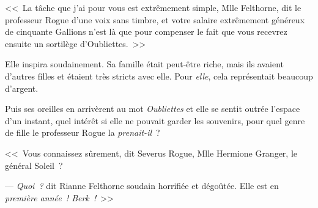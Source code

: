 <<~La tâche que j'ai pour vous est extrêmement simple, Mlle Felthorne, dit le professeur Rogue d'une voix sans timbre, et votre salaire extrêmement généreux de cinquante Gallions n'est là que pour compenser le fait que vous recevrez ensuite un sortilège d'Oubliettes.~>>

Elle inspira soudainement. Sa famille était peut-être riche, mais ils avaient d'autres filles et étaient très stricts avec elle. Pour \emph{elle}, cela représentait beaucoup d'argent.

Puis ses oreilles en arrivèrent au mot \emph{Oubliettes} et elle se sentit outrée l'espace d'un instant, quel intérêt si elle ne pouvait garder les souvenirs, pour quel genre de fille le professeur Rogue la \emph{prenait-il}~?

<<~Vous connaissez sûrement, dit Severus Rogue, Mlle Hermione Granger, le général Soleil~?

--- \emph{Quoi~?} dit Rianne Felthorne soudain horrifiée et dégoûtée. Elle est en \emph{première année~! Berk~!}~>>
